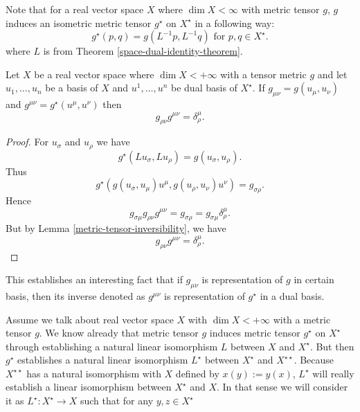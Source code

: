 \documentclass[main.tex]{subfiles}
\begin{document}
Note that for a real vector space $X$ where $\dim X < \infty$ with metric tensor $g$, $g$ induces an isometric metric tensor $g^\star$ on $X^\star$ in a following way:
\begin{equation}
g^\star (p, q) = g(L^{-1}p, L^{-1}q) \text{ for } p, q\in X^\star.
\end{equation}
where $L$ is from Theorem \ref{space-dual-identity-theorem}.

\begin{theorem}
Let $X$ be a real vector space where $\dim X < +\infty$ with a tensor metric $g$ and let $u_1, \dots, u_n$ be a basis of $X$ and $u^1, \dots, u^n$ be dual basis of $X^\star$. If $g_{\mu\nu} = g(u_\mu, u_\nu)$ and $g^{\mu\nu} = g^\star(u^\mu, u^\nu)$ then
\begin{equation}
g_{\rho\nu} g^{\mu\nu} = \delta^\mu_\rho.
\end{equation}
\end{theorem}
\begin{proof}
For $u_\sigma$ and $u_\rho$ we have
\begin{equation}
g^\star(Lu_\sigma, Lu_\rho) = g(u_\sigma, u_\rho).
\end{equation}
Thus
\begin{equation}
g^\star(g(u_\sigma, u_\mu)u^\mu, g(u_\rho, u_\nu)u^\nu) = g_{\sigma\rho}. 
\end{equation}
Hence
\begin{equation}
g_{\sigma\mu}g_{\rho\nu}g^{\mu\nu} = g_{\sigma \rho} = g_{\sigma\mu} \delta^\mu_\rho.
\end{equation}
But by Lemma \ref{metric-tensor-inversibility}, we have
\begin{equation}
g_{\rho\nu}g^{\mu\nu} = \delta^\mu_\rho.
\end{equation}
\end{proof}

This establishes an interesting fact that if $g_{\mu\nu}$ is representation of $g$ in certain basis, then its inverse denoted as $g^{\mu\nu}$ is representation of $g^\star$ in a dual basis.

Assume we talk about real vector space $X$ with $\dim X < +\infty$ with a metric tensor $g$. We know already that metric tensor $g$ induces metric tensor $g^\star$ on $X^\star$ through establishing a natural linear isomorphism $L$ between $X$ and $X^\star$. But then $g^\star$ establishes a natural linear isomorphism $L^\star$ between $X^\star$ and $X^{\star\star}$. Because $X^{\star\star}$ has a natural isomorphism with $X$ defined by $x(y):=y(x)$, $L^\star$ will really establish a linear isomorphism between $X^\star$ and $X$. In that sense we will consider it as $L^\star:X^\star \to X$ such that for any $y, z\in X^\star$
\end{document}
